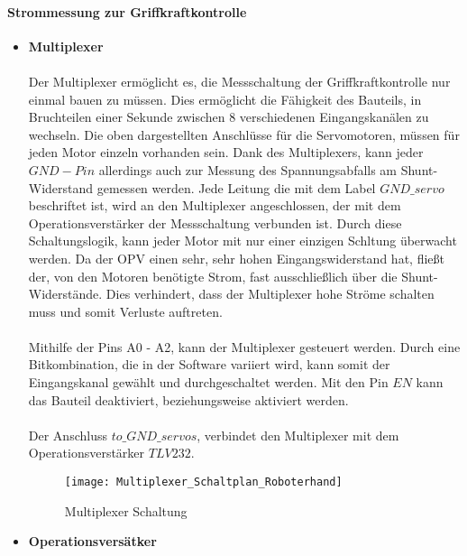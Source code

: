 \documentclass[titlepage,12pt,twoside]{article}
\begin{document}
\paragraph{Strommessung zur Griffkraftkontrolle}
\hfill \break
\hfill \break
\begin{itemize}
	\item \textbf{Multiplexer} \\
	\\
	Der Multiplexer ermöglicht es, die Messschaltung der Griffkraftkontrolle nur einmal bauen zu müssen. Dies ermöglicht die Fähigkeit des Bauteils, in Bruchteilen einer Sekunde zwischen 8 verschiedenen Eingangskanälen zu wechseln.
	Die oben dargestellten Anschlüsse für die Servomotoren, müssen für jeden Motor einzeln vorhanden sein. Dank des Multiplexers, kann jeder $GND-Pin$ allerdings auch zur Messung des Spannungsabfalls am Shunt-Widerstand gemessen werden.
	Jede Leitung die mit dem Label $GND\_servo$ beschriftet ist, wird an den Multiplexer angeschlossen, der mit dem Operationsverstärker der Messschaltung verbunden ist. Durch diese Schaltungslogik, kann jeder Motor mit nur einer einzigen
	Schltung überwacht werden. Da der OPV einen sehr, sehr hohen Eingangswiderstand hat, fließt der, von den Motoren benötigte Strom, fast ausschließlich über die Shunt-Widerstände. Dies verhindert, dass der Multiplexer hohe Ströme
	schalten muss und somit Verluste auftreten. \\
	\\
	Mithilfe der Pins A0 - A2, kann der Multiplexer gesteuert werden. Durch eine Bitkombination, die in der Software variiert wird, kann somit der Eingangskanal gewählt und durchgeschaltet werden. Mit den Pin $EN$ kann das Bauteil deaktiviert,
	beziehungsweise aktiviert werden. \\
	\\
	Der Anschluss $to\_GND\_servos$, verbindet den Multiplexer mit dem Operationsverstärker $TLV232$.
	\\
	\begin{figure}[H]
		\begin{center}
			\scalebox{0.6}
			{\texttt{[image: Multiplexer\_Schaltplan\_Roboterhand]}}
			\caption{Multiplexer Schaltung}
			\label{fig:Multiplexer_Schaltplan_Roboterhand}		
			\end{center}
	\end{figure}
	\hfill \break
	\newpage
	\item \textbf{Operationsversätker} \\
	\\

\end{itemize}
\end{document}
